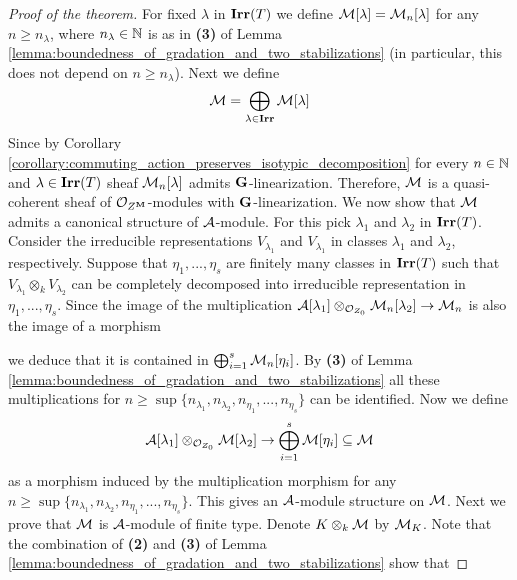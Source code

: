 \begin{proof}[Proof of the theorem]
For fixed $\lambda$ in $\mathbf{Irr}(T)$ we define ${\mathcal M}[\lambda] = {\mathcal M}_n[\lambda]$ for any $n\geq n_{\lambda}$, where $n_{\lambda}\in {\mathbb N}$ is as in \textbf{(3)} of Lemma \ref{lemma:boundedness_of_gradation_and_two_stabilizations} (in particular, this does not depend on $n\geq n_{\lambda}$). Next we define
$${\mathcal M} = \bigoplus_{\lambda\in \mathbf{Irr}}{\mathcal M}[\lambda]$$
Since by Corollary \ref{corollary:commuting_action_preserves_isotypic_decomposition} for every $n\in {\mathbb N}$ and $\lambda \in \mathbf{Irr}(T)$ sheaf ${\mathcal M}_n[\lambda]$ admits $\mathbf{G}$-linearization. Therefore, ${\mathcal M}$ is a quasi-coherent sheaf of ${\mathcal O}_{Z^{\mathbf{M}}}$-modules with $\mathbf{G}$-linearization. We now show that ${\mathcal M}$ admits a canonical structure of ${\mathcal A}$-module. For this pick $\lambda_1$ and $\lambda_2$ in $\mathbf{Irr}(T)$. Consider the irreducible representations $V_{\lambda_1}$ and $V_{\lambda_1}$ in classes $\lambda_1$ and $\lambda_2$, respectively. Suppose that $\eta_1,...,\eta_s$ are finitely many classes in $\mathbf{Irr}(T)$ such that $V_{\lambda_1}\otimes_k V_{\lambda_2}$ can be completely decomposed into irreducible representation in $\eta_1,...,\eta_s$. Since the image of the multiplication ${\mathcal A}[\lambda_1]\otimes_{{\mathcal O}_{Z_0}}{\mathcal M}_n[\lambda_2]\rightarrow {\mathcal M}_n$ is also the image of a morphism
\begin{center}
\end{center}
we deduce that it is contained in $\bigoplus_{i=1}^s{\mathcal M}_n[\eta_i]$. By \textbf{(3)} of Lemma \ref{lemma:boundedness_of_gradation_and_two_stabilizations} all these multiplications for $n\geq \sup \{n_{\lambda_1},n_{\lambda_2},n_{\eta_1},...,n_{\eta_s}\}$ can be identified. Now we define
$${\mathcal A}[\lambda_1]\otimes_{{\mathcal O}_{Z_0}} {\mathcal M}[\lambda_2]\rightarrow  \bigoplus_{i=1}^s{\mathcal M}[\eta_i]\subseteq {\mathcal M}$$
as a morphism induced by the multiplication morphism for any $n\geq \sup\{n_{\lambda_1},n_{\lambda_2},n_{\eta_1},...,n_{\eta_s}\}$. This gives an ${\mathcal A}$-module structure on ${\mathcal M}$. Next we prove that ${\mathcal M}$ is ${\mathcal A}$-module of finite type. Denote $K\otimes_k{\mathcal M}$ by ${\mathcal M}_K$. Note that the combination of \textbf{(2)} and \textbf{(3)} of Lemma \ref{lemma:boundedness_of_gradation_and_two_stabilizations} show that

\end{proof}
